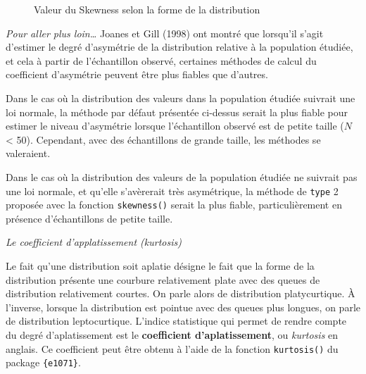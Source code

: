 \documentclass[
  letterpaper,
]{book}
\begin{document}
\begin{figure}


\caption{\label{fig-skeweddistri}Valeur du Skewness selon la forme de la
distribution}

\end{figure}%

\emph{Pour aller plus loin\ldots{}} Joanes et Gill (1998) ont montré que
lorsqu'il s'agit d'estimer le degré d'asymétrie de la distribution
relative à la population étudiée, et cela à partir de l'échantillon
observé, certaines méthodes de calcul du coefficient d'asymétrie peuvent
être plus fiables que d'autres.

Dans le cas où la distribution des valeurs dans la population étudiée
suivrait une loi normale, la méthode par défaut présentée ci-dessus
serait la plus fiable pour estimer le niveau d'asymétrie lorsque
l'échantillon observé est de petite taille (\(N\) \textless{} 50).
Cependant, avec des échantillons de grande taille, les méthodes se
valeraient.

Dans le cas où la distribution des valeurs de la population étudiée ne
suivrait pas une loi normale, et qu'elle s'avèrerait très asymétrique,
la méthode de \texttt{type} 2 proposée avec la fonction
\texttt{skewness()} serait la plus fiable, particulièrement en présence
d'échantillons de petite taille.

\emph{Le coefficient d'applatissement (kurtosis)}

Le fait qu'une distribution soit aplatie désigne le fait que la forme de
la distribution présente une courbure relativement plate avec des queues
de distribution relativement courtes. On parle alors de distribution
platycurtique. À l'inverse, lorsque la distribution est pointue avec des
queues plus longues, on parle de distribution leptocurtique. L'indice
statistique qui permet de rendre compte du degré d'aplatissement est le
\textbf{coefficient d'aplatissement}, ou \emph{kurtosis} en anglais. Ce
coefficient peut être obtenu à l'aide de la fonction \texttt{kurtosis()}
du package \texttt{\{e1071\}}.
\end{document}

